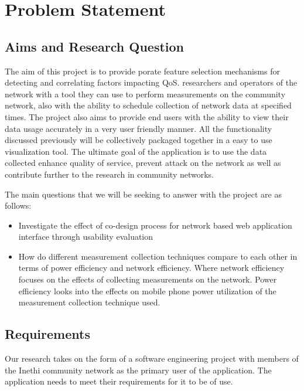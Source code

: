 \section{Problem Statement}
\subsection{Aims and Research Question}
The aim of this project is to provide porate feature selection mechanisms for detecting and correlating factors impacting QoS.
researchers and operators of the network with a tool they can use to perform measurements on the community network, also with the ability to schedule collection of network data at specified times. The project also aims to provide end users with the ability to view their data usage accurately in a very user friendly manner. All the functionality discussed previously will be collectively packaged together in a easy to use visualization tool. The ultimate goal of the application is to use the data collected enhance quality of service, prevent attack on the network as well as contribute further to the research in community networks.

The main questions that we will be seeking to answer with the project are as follows:
\begin{itemize}
	\item Investigate the effect of co-design process for network based web application interface through usability evaluation 
	\item How do different measurement collection techniques compare to each other in terms of power efficiency and network efficiency. Where network efficiency focuses on the effects of collecting measurements on the network. Power efficiency looks into the effects on mobile phone power utilization of the measurement collection technique used.
\end{itemize}

\subsection{Requirements}
Our research takes on the form of a software engineering project with members of the Inethi community network as the primary user of the application. The application needs to meet their requirements for it to be of use.

